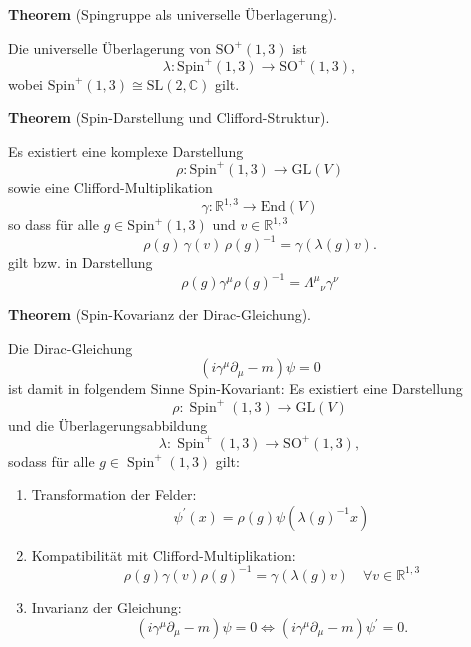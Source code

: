 \documentclass[10pt, letterpaper]{article}
\newcommand{\End}{\mathrm{End}}
\newcommand{\GL}{\mathrm{GL}}
\newcommand{\SL}{\mathrm{SL}}
\newcommand{\SO}{\mathrm{SO}}
\newcommand{\Spin}{\mathrm{Spin}}
\newcommand{\CustomHeading}[3]{%
  \par\medskip\noindent%
  \textbf{#1 #2} \textnormal{(#3)}.\enskip%
}
\newenvironment{THEO}[2]{\CustomHeading{Theorem}{#1}{#2}}{}
\begin{document}
\begin{THEO}{}{Spingruppe als universelle Überlagerung}
Die universelle Überlagerung von $\SO^{+}(1,3)$ ist
\[
\lambda:\Spin^{+}(1,3)\to\SO^{+}(1,3),
\]
wobei $\Spin^{+}(1,3)\cong \SL(2,\mathbb{C})$ gilt.
\end{THEO}

\begin{THEO}{}{Spin-Darstellung und Clifford-Struktur}
Es existiert eine komplexe Darstellung
\[
\rho:\Spin^{+}(1,3)\to\GL(V)
\]
sowie eine Clifford-Multiplikation
\[
\gamma:\mathbb{R}^{1,3}\to\End(V)
\]
so dass für alle $g\in\Spin^{+}(1,3)$ und $v\in\mathbb{R}^{1,3}$
\[
\rho(g)\,\gamma(v)\,\rho(g)^{-1}
= \gamma(\lambda(g)v).
\]
gilt bzw. in Darstellung
$$\rho(g) \gamma^\mu \rho(g)^{-1}=\Lambda^\mu{ }_\nu \gamma^\nu$$
\end{THEO}

\begin{THEO}{}{Spin-Kovarianz der Dirac-Gleichung}
Die Dirac-Gleichung
$$
\left(i \gamma^\mu \partial_\mu-m\right) \psi=0
$$
ist damit in folgendem Sinne Spin-Kovariant: Es existiert eine Darstellung
$$
\rho:  \operatorname{Spin}^{+}(1,3) \rightarrow  \mathrm{GL}(V)
$$
und die Überlagerungsabbildung
$$
\lambda: \operatorname{Spin}^{+}(1,3) \rightarrow \mathrm{SO}^{+}(1,3),
$$
sodass für alle $g \in \operatorname{Spin}^{+}(1,3)$ gilt: 
\begin{enumerate}
  \item Transformation der Felder:
  $$
  \psi^{\prime}(x)=\rho(g) \psi\left(\lambda(g)^{-1} x\right)
  $$
  \item Kompatibilität mit Clifford-Multiplikation:
  $$
  \rho(g) \gamma(v) \rho(g)^{-1}=\gamma(\lambda(g) v) \quad \forall v \in \mathbb{R}^{1,3}
  $$
  \item Invarianz der Gleichung:
  $$
  \left(i \gamma^\mu \partial_\mu-m\right) \psi=0 \Longleftrightarrow\left(i \gamma^\mu \partial_\mu-m\right) \psi^{\prime}=0 .
  $$
\end{enumerate}
\end{THEO}
\end{document}
